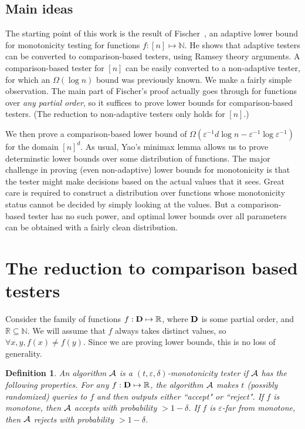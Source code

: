 \documentclass[11pt]{article}
\newtheorem{definition}[theorem]{Definition}
\def\eps{\varepsilon}
\def\R{{\mathbb R}}
\def\x{{\bf x}}
\newcommand{\cA}{{\cal A}}
\newcommand{\NN}{\mathbb{N}}
\newcommand{\acc}{\hbox{acc}}
\newcommand{\rej}{\hbox{rej}}
\begin{document}
\subsection{Main ideas} \label{sec:ideas}

The starting point of this work is the result of Fischer~\cite{E04}, an adaptive lower bound for monotonicity
testing for functions $f:[n] \mapsto \NN$. He shows that adaptive testers can be converted to comparison-based
testers, using Ramsey theory arguments. A comparison-based tester for $[n]$ can be easily converted to a non-adaptive
tester, for which an $\Omega(\log n)$ bound was previously known. We make a fairly simple observation. The main part of Fischer's proof
actually goes through for functions over \emph{any partial order}, so it suffices to prove lower bounds
for comparison-based testers. (The reduction to non-adaptive testers only holds for $[n]$.)

We then prove a comparison-based lower bound of $\Omega(\eps^{-1} d\log n - \eps^{-1}\log \eps^{-1})$
for the domain $[n]^d$. 
As usual, Yao's minimax lemma allows us to prove determinstic lower bounds over some distribution of functions.
The major challenge in proving (even non-adaptive) lower bounds for monotonicity is that the tester might make decisions
based on the actual values that it sees. Great care is required to construct a distribution over functions
whose monotonicity status cannot be decided by simply looking at the values.
But a comparison-based tester has no such power, and
optimal lower bounds over all parameters can be obtained with a fairly clean distribution.

\section{The reduction to comparison based testers} \label{sec:prelim}

Consider the family of functions $f: \D \mapsto \R$, where ${\mathbf D}$ is some partial order, and $\R\subseteq \NN$.
We will assume that $f$ always takes distinct values, so $\forall x,y, f(x) \neq f(y)$. Since we are proving
lower bounds, this is no loss of generality.

\begin{definition} \label{def:tester}
An algorithm $\cA$ is a \emph{$(t,\eps,\delta)$-monotonicity tester}
if $\cA$ has the following properties. For any $f:\D\mapsto \R$, the algorithm $\cA$ makes $t$ (possibly randomized) queries to $f$
and then outputs either ``accept" or ``reject". If $f$ is monotone, then $\cA$ accepts with probability $>1-\delta$.
If $f$ is $\eps$-far from monotone, then $\cA$ rejects with probability $>1-\delta$.
\end{definition}
\def\acc{{\tt acc}}
\def\rej{{\tt rej}}
\def\x{{\mathbf x}}
\def\a{{\mathbf a}}
\end{document}
